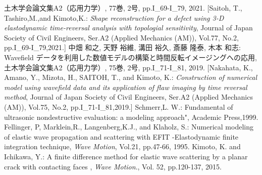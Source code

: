 \documentclass[jscefinal]{jjsce}%
\begin{document}
\begin{thebibliography}{9}
	土木学会論文集A2（応用力学）, 77巻, 2号, pp.I\_69-I\_79, 2021.
	[Saitoh, T., Tashiro,M.,and Kimoto,K.:
	\textit{Shape reconstruction for a defect using 3-D elastodynamic time-reversal analysis with topologial sensitivity}, 
	Journal of Japan Society of Civil Engineers, Ser.A2 (Applied Mechanics (AM)), 
	Vol.77, No.2, pp.I\_69-I\_79,2021.] 
	中畑 和之, 天野 裕維, 溝田 裕久, 斎藤 隆泰, 木本 和志:
	Wavefield データを利用した数値モデルの構築と時間反転イメージングへの応用,
	土木学会論文集A2（応用力学）, 75巻, 2号, pp.I\_71-I\_81, 2019.
	[Nakahata, K., Amano, Y., Mizota, H., SAITOH, T., and Kimoto, K.:
	\textit{Construction of numerical model using wavefield data and its 
	application of flaw imaging by time reversal method},
	Journal of Japan Society of Civil Engineers, Ser.A2 (Applied Mechanics (AM)), 
	Vol.75, No.2, pp.I\_71-I\_81,2019.] 
	Schmerr,L. W.:
	Fundamental of ultrasonic nondestructive evaluation: a modeling approach", Academic Press,1999.	
	Fellinger, P, Marklein,R., Langenberg,K.J., and Klaholz, S.: 
	Numerical modeling of elastic wave propagation and scattering with EFIT 
	-Elastodynamic finite integration technique, 
	\textit{ Wave Motion}, Vol.21, pp.47-66, 1995.
	Kimoto, K. and Ichikawa, Y.:
	A finite difference method for elastic wave scattering by a planar crack with contacting faces
	, \textit{Wave Motion}., Vol. 52, pp.120-137, 2015.
\end{thebibliography}
\end{document}
